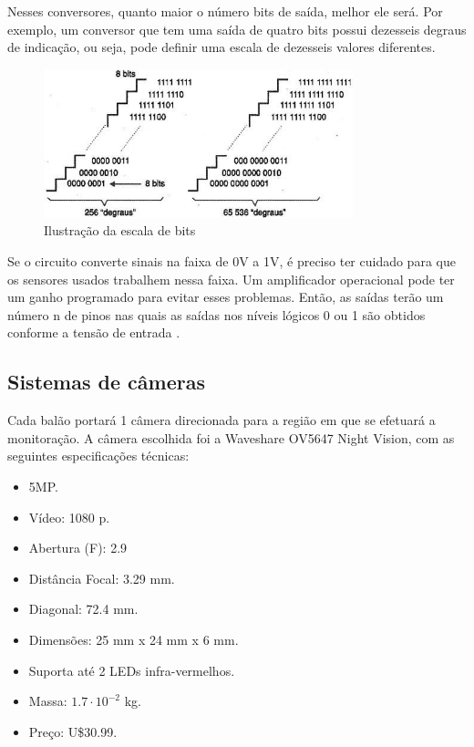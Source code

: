 Nesses conversores, quanto maior o número bits de saída, melhor ele será. Por exemplo, um conversor que tem uma saída de quatro bits possui dezesseis degraus de indicação, ou seja, pode definir uma escala de dezesseis valores diferentes.

\begin{figure}[H]
  \centering
  \includegraphics[width=0.8\textwidth]{figuras/ADC}
  \caption[Ilustração da escala de bits]{Ilustração da escala de bits~\cite{conversoresad}}
  \label{img:escaladebits}
\end{figure}

Se o circuito converte sinais na faixa de 0V a 1V, é preciso ter cuidado para que os sensores usados trabalhem nessa faixa. Um amplificador operacional pode ter um ganho programado para evitar esses problemas. Então, as saídas terão um número n de pinos nas quais as saídas nos níveis lógicos 0 ou 1 são obtidos conforme a tensão de entrada \cite{conversoresad}.

\subsection{Sistemas de câmeras}

Cada balão portará 1 câmera direcionada para a região em que se efetuará a monitoração. A câmera escolhida foi a Waveshare OV5647 Night Vision, com as seguintes especificações técnicas:

\begin{itemize}
	\item 5MP.
	\item Vídeo: 1080 p.
	\item Abertura (F): 2.9
	\item Distância Focal: 3.29 mm.
	\item Diagonal: 72.4 mm.
	\item Dimensões: 25 mm x 24 mm x 6 mm.
	\item Suporta até 2 LEDs infra-vermelhos.
	\item Massa: $1.7 \cdot 10^{-2}$ kg.
	\item Preço: U\$30.99.
\end{itemize}

